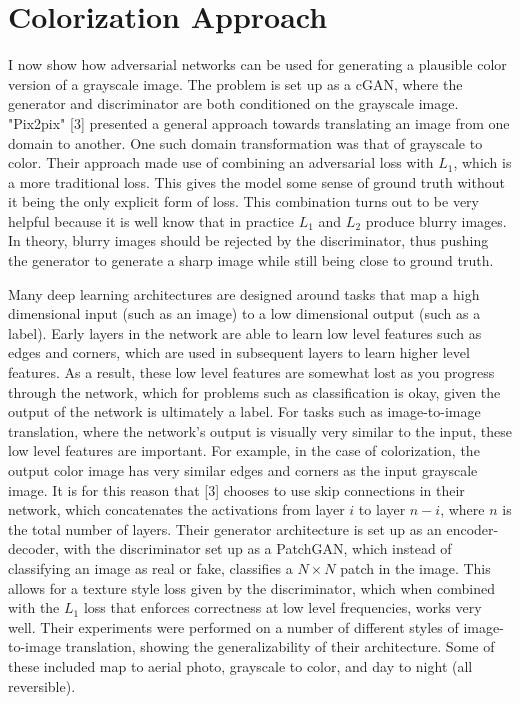 \documentclass[9pt]{article}
\begin{document}
\section{Colorization Approach}
I now show how adversarial networks can be used for generating a plausible color version of a grayscale image. The problem is set up as a cGAN, where the generator and discriminator
are both conditioned on the grayscale image. "Pix2pix" [3] presented a general approach towards translating an image from one domain to another. One such domain transformation was that of
grayscale to color. Their approach made use of combining an adversarial loss with $L_1$, which is a more traditional loss. This gives the model some sense of ground truth without it
being the only explicit form of loss. This combination turns out to be very helpful because it is well know that in practice $L_1$ and $L_2$ produce blurry images. In theory, blurry
images should be rejected by the discriminator, thus pushing the generator to generate a sharp image while still being close to ground truth. \newline

\noindent Many deep learning architectures are designed around tasks that map a high dimensional input (such as an image) to a low dimensional output (such as a label). Early layers in
the network are able to learn low level features such as edges and corners, which are used in subsequent layers to learn higher level features. As a result, these low level features are
somewhat lost as you progress through the network, which for problems such as classification is okay, given the output of the network is ultimately a label. For tasks such as
image-to-image translation, where the network's output is visually very similar to the input, these low level features are important. For example, in the case of colorization, the
output color image has very similar edges and corners as the input grayscale image. It is for this reason that [3] chooses to use skip connections in their network, which concatenates the
activations from layer $i$ to layer $n-i$, where $n$ is the total number of layers. Their generator architecture is set up as an encoder-decoder, with the discriminator set up as a PatchGAN,
which instead of classifying an image as real or fake, classifies a $N \times N$ patch in the image. This allows for a texture style loss given by the discriminator, which when combined with
the $L_1$ loss that enforces correctness at low level frequencies, works very well. Their experiments were performed on a number of different styles of image-to-image translation, showing
the generalizability of their architecture. Some of these included map to aerial photo, grayscale to color, and day to night (all reversible). \newline
\end{document}
